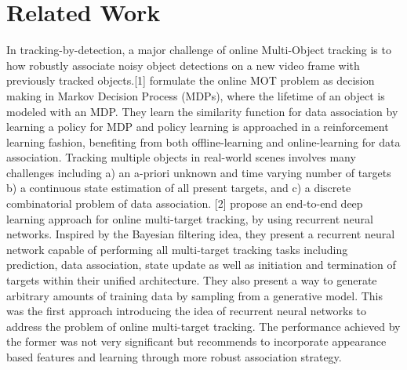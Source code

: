 \documentclass[journal]{IEEEtran}
\begin{document}
\section{Related Work}
In tracking-by-detection, a major challenge of online Multi-Object tracking is to how robustly associate noisy object detections on a new video frame with previously tracked objects.[1] formulate the online MOT problem as decision making in Markov Decision Process (MDPs), where the lifetime of an object is modeled with an MDP. They learn the similarity function for data association by learning a policy for MDP and policy learning is approached in a reinforcement learning fashion, benefiting from both offline-learning and online-learning for data association. Tracking multiple objects in real-world scenes involves many challenges including a) an a-priori unknown and time varying number of targets b) a continuous state estimation of all present targets, and c) a discrete combinatorial problem of data association. [2] propose an end-to-end deep learning approach for online multi-target tracking, by using recurrent neural networks. Inspired by the Bayesian filtering idea, they present a recurrent neural network capable of performing all multi-target tracking tasks including prediction, data association, state update as well as initiation and termination of targets within their unified architecture. They also present a way to generate arbitrary amounts of training data by sampling from a generative model. This was the first approach introducing the idea of recurrent neural networks to address the problem of online multi-target tracking. The performance achieved by the former was not very significant but recommends to incorporate appearance based features and learning through more robust association strategy.
\end{document}
